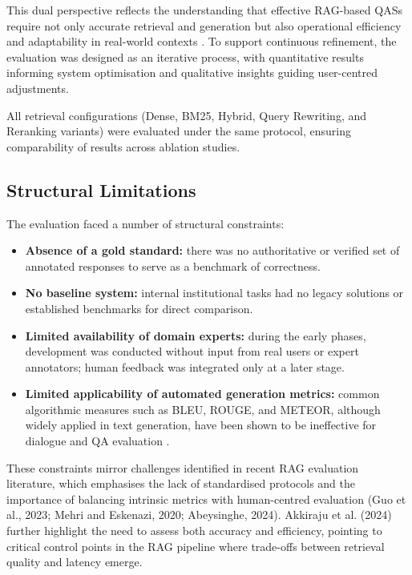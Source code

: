 \begin{spacing}{1.5}
This dual perspective reflects the understanding that effective RAG-based QASs require not only accurate retrieval and generation but also operational efficiency and adaptability in real-world contexts \citep{akkiraju_facts_2024}. To support continuous refinement, the evaluation was designed as an iterative process, with quantitative results informing system optimisation and qualitative insights guiding user-centred adjustments.

All retrieval configurations (Dense, BM25, Hybrid, Query Rewriting, and Reranking variants) were evaluated under the same protocol, ensuring comparability of results across ablation studies.

\subsection{Structural Limitations}

The evaluation faced a number of structural constraints:
\begin{itemize}
      \item \textbf{Absence of a gold standard:} there was no authoritative or verified set of annotated responses to serve as a benchmark of correctness.
      \item \textbf{No baseline system:} internal institutional tasks had no legacy solutions or established benchmarks for direct comparison.
      \item \textbf{Limited availability of domain experts:} during the early phases, development was conducted without input from real users or expert annotators; human feedback was integrated only at a later stage.
      \item \textbf{Limited applicability of automated generation metrics:} common algorithmic measures such as BLEU, ROUGE, and METEOR, although widely applied in text generation, have been shown to be ineffective for dialogue and QA evaluation \citep{deriu_survey_2020,liu_how_2016}.
\end{itemize}

These constraints mirror challenges identified in recent RAG evaluation literature, which emphasises the lack of standardised protocols and the importance of balancing intrinsic metrics with human-centred evaluation (Guo et al., 2023; Mehri and Eskenazi, 2020; Abeysinghe, 2024). Akkiraju et al. (2024) further highlight the need to assess both accuracy and efficiency, pointing to critical control points in the RAG pipeline where trade-offs between retrieval quality and latency emerge.



\end{spacing}
